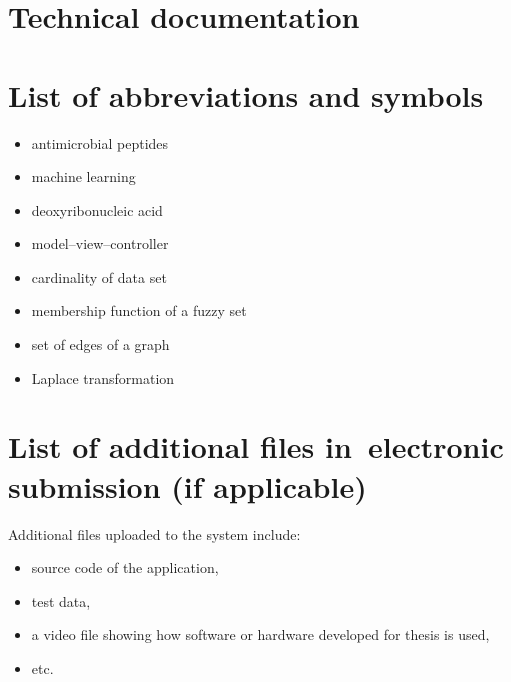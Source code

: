 \documentclass[a4paper,twoside,12pt]{book}
\begin{document}
\backmatter

\printbibliography           %

\begin{appendices}

\chapter{Technical documentation}


\chapter{List of abbreviations and symbols}

\begin{itemize}
\item[AMP] antimicrobial peptides 
\item[ML]  machine learning
\item[DNA] deoxyribonucleic acid
\item[MVC] model--view--controller 
\item[$N$] cardinality of data set
\item[$\mu$] membership function of a fuzzy set
\item[$\mathbb{E}$] set of edges of a graph
\item[$\mathcal{L}$] Laplace transformation
\end{itemize}

\chapter{List of additional files in~electronic submission (if applicable)}

Additional files uploaded to the system include:
\begin{itemize}
\item source code of the application,
\item test data,
\item a video file showing how software or hardware developed for thesis is used,
\item etc.
\end{itemize}



\listoffigures
{}
\listoftables
{}

\end{appendices}
\end{document}
